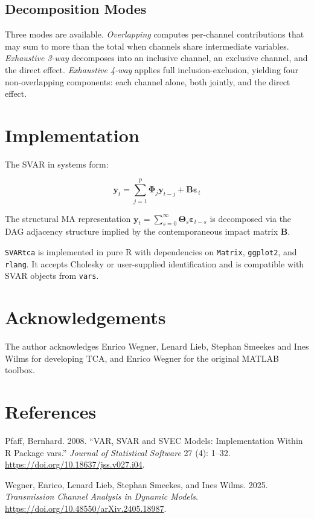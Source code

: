\subsection{Decomposition Modes}\label{decomposition-modes}

Three modes are available. \emph{Overlapping} computes per-channel
contributions that may sum to more than the total when channels share
intermediate variables. \emph{Exhaustive 3-way} decomposes into an
inclusive channel, an exclusive channel, and the direct effect.
\emph{Exhaustive 4-way} applies full inclusion-exclusion, yielding four
non-overlapping components: each channel alone, both jointly, and the
direct effect.

\section{Implementation}\label{implementation}

The SVAR in systems form:

\[\mathbf{y}_t = \sum_{j=1}^{p} \mathbf{\Phi}_j \mathbf{y}_{t-j} + \mathbf{B} \boldsymbol{\varepsilon}_t\]

The structural MA representation
\(\mathbf{y}_t = \sum_{s=0}^{\infty} \mathbf{\Theta}_s \boldsymbol{\varepsilon}_{t-s}\)
is decomposed via the DAG adjacency structure implied by the
contemporaneous impact matrix \(\mathbf{B}\).

\texttt{SVARtca} is implemented in pure R with dependencies on
\texttt{Matrix}, \texttt{ggplot2}, and \texttt{rlang}. It accepts
Cholesky or user-supplied identification and is compatible with SVAR
objects from \texttt{vars}.

\section{Acknowledgements}\label{acknowledgements}

The author acknowledges Enrico Wegner, Lenard Lieb, Stephan Smeekes and
Ines Wilms for developing TCA, and Enrico Wegner for the original MATLAB
toolbox.

\section*{References}\label{references}

\protect{}\label{refs}
\begin{CSLReferences}{1}{1}
Pfaff, Bernhard. 2008. {``{VAR}, {SVAR} and {SVEC} Models:
Implementation Within {R} Package {vars}.''} \emph{Journal of
Statistical Software} 27 (4): 1--32.
\url{https://doi.org/10.18637/jss.v027.i04}.

Wegner, Enrico, Lenard Lieb, Stephan Smeekes, and Ines Wilms. 2025.
\emph{Transmission Channel Analysis in Dynamic Models}.
\url{https://doi.org/10.48550/arXiv.2405.18987}.

\end{CSLReferences}
